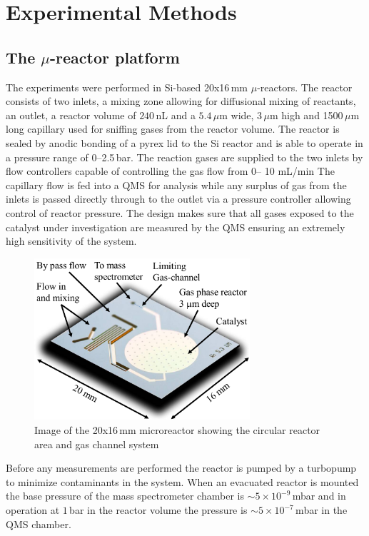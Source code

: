 \documentclass[journal=jacsat,manuscript=article]{achemso}
\begin{document}
\section{Experimental Methods}
\subsection{The $\mu$-reactor platform}
The experiments were performed in Si-based 20x16\,mm
$\mu$-reactors\cite{Henriksen2009}. The reactor consists of two inlets, a
mixing zone allowing for diffusional mixing of reactants, an outlet, a reactor
volume of $240\,$nL and a $5.4\,\mu$m wide, 3\,$\mu$m high and 1500\,$\mu$m
long capillary used for sniffing gases from the reactor volume. The reactor is
sealed by anodic bonding of a pyrex lid to the Si reactor and is able to
operate in a pressure range of 0--2.5\,bar. The reaction gases are supplied to
the two inlets by flow controllers capable of controlling the gas flow from 0--
10 mL/min The capillary flow is fed into a QMS
for analysis while any surplus of gas from the inlets is passed directly
through to the outlet via a pressure controller allowing control of reactor
pressure. The design makes sure that all gases exposed to the catalyst under
investigation are measured by the QMS ensuring an extremely high sensitivity of
the system. \begin{figure} \includegraphics[width=8cm]{Ib-reactor.png}
\caption{Image of the 20x16\,mm microreactor showing the circular reactor area
and gas channel system} \label{fgr:reactor} \end{figure} Before any
measurements are performed the reactor is pumped by a turbopump to minimize
contaminants in the system. When an evacuated reactor is mounted the base
pressure of the mass spectrometer chamber is $\sim5\times10^{-9}\,$mbar and in
operation at $1\,$bar in the reactor volume the pressure is
$\sim5\times10^{-7}\,$mbar in the QMS chamber.
\end{document}
